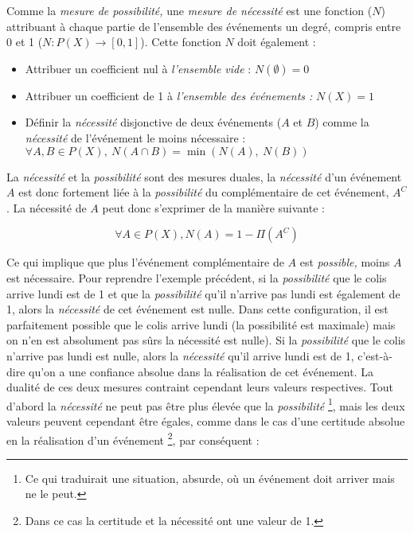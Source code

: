 Comme la \emph{mesure de possibilité,} une \emph{mesure de nécessité}
est une fonction (\(N\)) attribuant à chaque partie de l'ensemble des
événements un degré, compris entre 0 et 1
(\(N : P(X) \rightarrow [0,1]\)). Cette fonction \(N\) doit également
:

\begin{itemize}
\item Attribuer un coefficient nul à \emph{l'ensemble vide} :
  \(N(∅)=0\)
\item Attribuer un coefficient de 1 à \emph{l'ensemble des événements
    :} \(N(X)=1\)
\item Définir la \emph{nécessité} disjonctive de deux événements
  (\(A\) et \(B\)) comme la \emph{nécessité} de l'événement le moins
  nécessaire : \(∀ A,B ∈ P(X),\ N(A \cap B) = \min(N(A),\ N(B))\)
\end{itemize}

La \emph{nécessité} et la \emph{possibilité} sont des mesures duales,
la \emph{nécessité} d'un événement \(A\) est donc fortement liée à la
\emph{possibilité} du complémentaire de cet événement, \(A^C\). La
nécessité de \(A\) peut donc s'exprimer de la manière suivante :

\begin{equation}
  \label{eq:nec_comp}
  \forall A \in P(X), N(A) = 1 - \Pi(A^C)
\end{equation}

Ce qui implique que plus l'événement complémentaire de \(A\) est
\emph{possible,} moins \(A\) est nécessaire. Pour reprendre l'exemple
précédent, si la \emph{possibilité} que le colis arrive lundi est de 1
et que la \emph{possibilité} qu'il n'arrive pas lundi est également de
1, alors la \emph{nécessité} de cet événement est nulle. Dans cette
configuration, il est parfaitement possible que le colis arrive lundi
(la possibilité est maximale) mais on n'en est absolument pas sûrs la
nécessité est nulle). Si la \emph{possibilité} que le colis n'arrive
pas lundi est nulle, alors la \emph{nécessité} qu'il arrive lundi est
de 1, c'est-à-dire qu'on a une confiance absolue dans la réalisation
de cet événement. La dualité de ces deux mesures contraint cependant
leurs valeurs respectives. Tout d'abord la \emph{nécessité} ne peut
pas être plus élevée que la \emph{possibilité} \footnote{Ce qui
  traduirait une situation, absurde, où un événement doit arriver mais
  ne le peut.}, mais les deux valeurs peuvent cependant être égales,
comme dans le cas d'une certitude absolue en la réalisation d'un
événement \footnote{Dans ce cas la certitude et la nécessité ont une
  valeur de 1.}, par conséquent :

